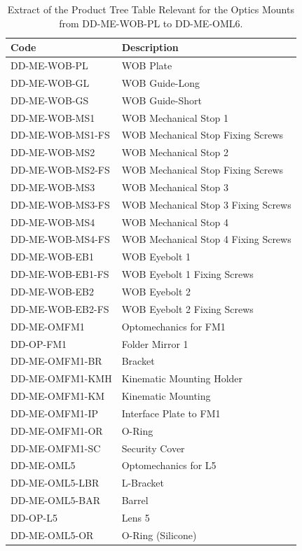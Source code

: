 \documentclass{report}
\begin{document}
\begin{table}
\caption{Extract of the Product Tree Table Relevant for the Optics Mounts from DD-ME-WOB-PL to DD-ME-OML6.}
\label{table:WOB-product-tree1}
\begin{center}
\footnotesize
\begin{tabular}{ll}
\hline
\hline
Code                &Description\\
\hline
DD-ME-WOB-PL	&	WOB Plate\\
DD-ME-WOB-GL	&	WOB Guide-Long\\
DD-ME-WOB-GS	&	WOB Guide-Short\\
DD-ME-WOB-MS1	&	WOB Mechanical Stop 1\\
DD-ME-WOB-MS1-FS	&	WOB Mechanical Stop Fixing Screws\\
DD-ME-WOB-MS2	&	WOB Mechanical Stop 2\\
DD-ME-WOB-MS2-FS	&	WOB Mechanical Stop Fixing Screws\\
DD-ME-WOB-MS3	& WOB Mechanical Stop 3\\
DD-ME-WOB-MS3-FS	& WOB Mechanical Stop 3 Fixing Screws \\
DD-ME-WOB-MS4	&	WOB Mechanical Stop 4	\\
DD-ME-WOB-MS4-FS	&	WOB Mechanical Stop 4 Fixing Screws	\\
DD-ME-WOB-EB1	&	WOB Eyebolt 1	\\
DD-ME-WOB-EB1-FS	&	WOB Eyebolt 1 Fixing Screws	\\
DD-ME-WOB-EB2	&	WOB Eyebolt 2	\\
DD-ME-WOB-EB2-FS	&	WOB Eyebolt 2 Fixing Screws	\\
\hline
DD-ME-OMFM1	&	Optomechanics for FM1	\\
DD-OP-FM1	&	Folder Mirror 1	\\
DD-ME-OMFM1-BR 	&	Bracket	\\
DD-ME-OMFM1-KMH 	&	Kinematic Mounting Holder	\\
DD-ME-OMFM1-KM 	&	Kinematic Mounting	\\
DD-ME-OMFM1-IP 	&	Interface Plate to FM1	\\
DD-ME-OMFM1-OR 	&	O-Ring	\\
DD-ME-OMFM1-SC 	&	Security Cover	\\
\hline
DD-ME-OML5	&	Optomechanics for L5	\\
DD-ME-OML5-LBR	&	L-Bracket	\\
DD-ME-OML5-BAR	&	Barrel	\\
DD-OP-L5	&	Lens 5	\\
DD-ME-OML5-OR	&	O-Ring (Silicone)	\\

\end{tabular}
\end{center}
\end{table}
\end{document}
